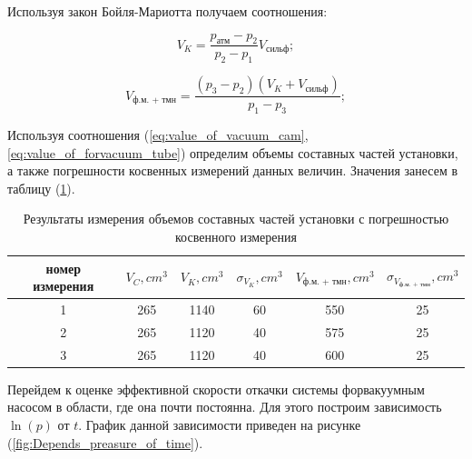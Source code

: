 \documentclass[12pt,a4paper]{article}
\begin{document}
	
	
	Используя закон Бойля-Мариотта получаем соотношения:
	
	\begin{equation}
		V_{K} = \frac{p_{\text{атм}} - p_{2}}{p_{2} - p_{1}} V_{\text{сильф}};
		\label{eq:value_of_vacuum_cam}
	\end{equation}
	
	\begin{equation}
		V_{\text{ф.м. + тмн}} = \frac{ \left( p_{3} - p_{2}\right) \left( V_{K} + V_{\text{сильф}}\right) }{p_{1} - p_{3}};
		\label{eq:value_of_forvacuum_tube}
	\end{equation}
	
	Используя соотношения (\ref{eq:value_of_vacuum_cam}, \ref{eq:value_of_forvacuum_tube}) определим объемы составных частей установки, а также погрешности косвенных измерений данных величин. Значения занесем в таблицу (\ref{tab:resultsof_measuring_for_diffrent_part_value}).
	
	\begin{table}[h]
		\centering
		\begin{tabular}{|c|c|c|c|c|c|}
		\hline
		номер измерения & $V_{C}, cm^{3}$ & $V_{K}, cm^{3}$ & $\sigma_{V_{K}}, cm^{3}$ & $V_{\text{ф.м. + тмн}}, cm^{3}$ & $\sigma_{V_{\text{ф.м. + тмн}}}, cm^{3}$ \\ \hline
		1               & 265             & 1140            & 60                       & 550                             & 25                                       \\ \hline
		2               & 265             & 1120            & 40                       & 575                      & 25                                       \\ \hline
		3               & 265             & 1120            & 40                       & 600                             & 25                                       \\ \hline
		\end{tabular}
		\caption{Результаты измерения объемов составных частей установки с погрешностью косвенного измерения}
		\label{tab:resultsof_measuring_for_diffrent_part_value}
	\end{table}
	
	Перейдем к оценке эффективной скорости откачки системы форвакуумным насосом в области, где она почти постоянна. Для этого построим зависимость $\ln (p) $ от $t$. График данной зависимости приведен на рисунке (\ref{fig:Depends_preasure_of_time}).
\end{document}
